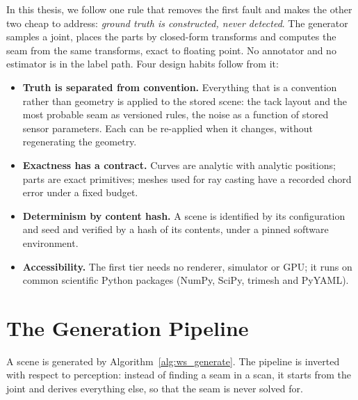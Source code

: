 In this thesis, we follow one rule that removes the first fault and makes the other two
cheap to address: \emph{ground truth is constructed, never detected}. The generator samples
a joint, places the parts by closed-form transforms and computes the seam from the same
transforms, exact to floating point. No annotator and no estimator is in the label path.
Four design habits follow from it:
\begin{itemize}
\item \textbf{Truth is separated from convention.} Everything that is a convention rather
  than geometry is applied to the stored scene: the tack layout and the most probable seam as
  versioned rules, the noise as a function of stored sensor parameters. Each can be re-applied
  when it changes, without regenerating the geometry.
\item \textbf{Exactness has a contract.} Curves are analytic with analytic positions; parts
  are exact primitives; meshes used for ray casting have a recorded chord error under a
  fixed budget.
\item \textbf{Determinism by content hash.} A scene is identified by its configuration and
  seed and verified by a hash of its contents, under a pinned software environment.
\item \textbf{Accessibility.} The first tier needs no renderer, simulator or GPU; it runs on
  common scientific Python packages (NumPy, SciPy, trimesh and PyYAML).
\end{itemize}

\section{The Generation Pipeline}
\label{sec:ws_pipeline}
A scene is generated by Algorithm~\ref{alg:ws_generate}. The pipeline is inverted with
respect to perception: instead of finding a seam in a scan, it starts from the joint and
derives everything else, so that the seam is never solved for.

